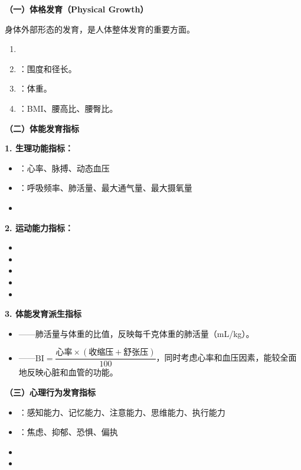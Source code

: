 \begin{defbox}
\textbf{（一）体格发育（Physical Growth）}

身体外部形态的发育，是人体整体发育的重要方面。

\begin{enumerate}[leftmargin=*]
    \item {}
    \item {}：围度和径长。
    \item {}：体重。
    \item {}：BMI、腰高比、腰臀比。
\end{enumerate}
\end{defbox}

\begin{keybox}
\textbf{（二）体能发育指标}

\textbf{1. 生理功能指标：}
\begin{itemize}[leftmargin=*]
    \item {}：心率、脉搏、动态血压
    \item {}：呼吸频率、肺活量、最大通气量、最大摄氧量
    \item {}
\end{itemize}

\textbf{2. 运动能力指标：}
\begin{itemize}[leftmargin=*]
    \item {}
    \item {}
    \item {}
    \item {}
    \item {}
\end{itemize}

\textbf{3. 体能发育派生指标}
\begin{itemize}[leftmargin=*]
    \item {}——肺活量与体重的比值，反映每千克体重的肺活量（mL/kg）。
    \item {}——$\text{BI} = \dfrac{\text{心率} \times (\text{收缩压} + \text{舒张压})}{100}$，同时考虑心率和血压因素，能较全面地反映心脏和血管的功能。
\end{itemize}
\end{keybox}

\begin{keybox}
\textbf{（三）心理行为发育指标}

\begin{itemize}[leftmargin=*]
    \item {}：感知能力、记忆能力、注意能力、思维能力、执行能力
    \item {}：焦虑、抑郁、恐惧、偏执
    \item {}
    \item {}
\end{itemize}
\end{keybox}



